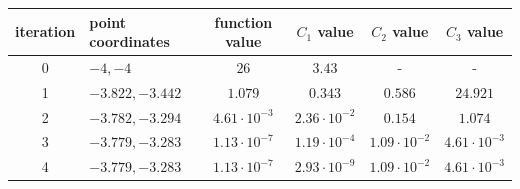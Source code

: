 \documentclass[12pt]{article}
\begin{document}
\begin{table}[H]
	\begin{tabularx}{\textwidth}{c|X|c|c|c|c|}
		iteration & point coordinates & function value & $C_1$ value & $C_2$ value & $C_3$ value\\
		\hline
		0 & $-4, -4$ & $26$ & $3.43$ & - & - \\
		\hline
		1 & $-3.822, -3.442$ & $1.079$ & $0.343$ & $0.586$ & $24.921$ \\
		\hline
		2 & $-3.782, -3.294$ & $4.61\cdot10^{-3}$ & $2.36\cdot10^{-2}$ & $0.154$ & $1.074$ \\
		\hline
		3 & $-3.779, -3.283$ & $1.13\cdot10^{-7}$ & $1.19\cdot10^{-4}$ & $1.09\cdot10^{-2}$ & $4.61\cdot10^{-3}$ \\ 
		\hline
		4 & $-3.779, -3.283$ & $1.13\cdot10^{-7}$ & $2.93\cdot10^{-9}$ & $1.09\cdot10^{-2}$ & $4.61\cdot10^{-3}$ \\
		\hline
	\end{tabularx}	
\end{table}	
\end{document}
